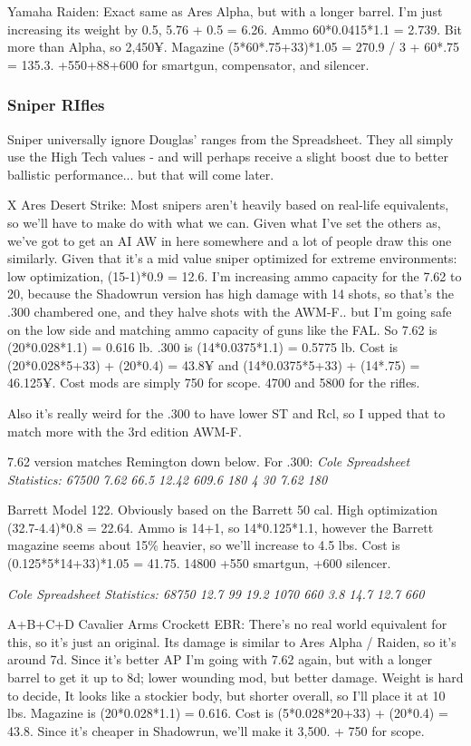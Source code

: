 \begin{multicols*}{2}
	Yamaha Raiden: Exact same as Ares Alpha, but with a longer barrel. I'm just increasing its weight by 0.5, 5.76 + 0.5 = 6.26. Ammo 60*0.0415*1.1 = 2.739. Bit more than Alpha, so 2,450¥. Magazine (5*60*.75+33)*1.05 = 270.9 / 3 + 60*.75 = 135.3. +550+88+600 for smartgun, compensator, and silencer.
	
	\subsubsection{Sniper RIfles}
	
	Sniper universally ignore Douglas' ranges from the Spreadsheet. They all simply use the High Tech values - and will perhaps receive a slight boost due to better ballistic performance... but that will come later.
	
	X Ares Desert Strike: Most snipers aren't heavily based on real-life equivalents, so we'll have to make do with what we can. Given what I've set the others as, we've got to get an AI AW in here somewhere and a lot of people draw this one similarly. Given that it's a mid value sniper optimized for extreme environments: low optimization, (15-1)*0.9 = 12.6. I'm increasing ammo capacity for the 7.62 to 20, because the Shadowrun version has high damage with 14 shots, so that's the .300 chambered one, and they halve shots with the AWM-F.. but I'm going safe on the low side and matching ammo capacity of guns like the FAL. So 7.62 is (20*0.028*1.1) = 0.616 lb. .300 is (14*0.0375*1.1) = 0.5775 lb. Cost is (20*0.028*5+33) + (20*0.4) = 43.8¥ and (14*0.0375*5+33) + (14*.75) = 46.125¥. Cost mods are simply 750 for scope. 4700 and 5800 for the rifles.
	
	Also it's really weird for the .300 to have lower ST and Rcl, so I upped that to match more with the 3rd edition AWM-F.
	
	7.62 version matches Remington down below.
	For .300:
	\textit{\textcolor{OliveGreen}{Cole Spreadsheet Statistics: 67500 7.62 66.5 12.42 609.6 180 4 30 7.62 180}}
	
	Barrett Model 122. Obviously based on the Barrett 50 cal. High optimization (32.7-4.4)*0.8 = 22.64. Ammo is  14+1, so  14*0.125*1.1, however the Barrett magazine seems about 15\% heavier, so we'll increase to 4.5 lbs. Cost is (0.125*5*14+33)*1.05 = 41.75. 14800 +550 smartgun, +600 silencer.
	
	\textit{\textcolor{OliveGreen}{Cole Spreadsheet Statistics: 68750 12.7 99 19.2 1070 660 3.8 14.7 12.7 660}}
	
	A+B+C+D
	Cavalier Arms Crockett EBR: There's no real world equivalent for this, so it's just an original. Its damage is similar to Ares Alpha / Raiden, so it's around 7d. Since it's better AP I'm going with 7.62 again, but with a longer barrel to get it up to 8d; lower wounding mod, but better damage. Weight is hard to decide,  It looks like a stockier body, but shorter overall, so I'll place it at 10 lbs. Magazine is (20*0.028*1.1) = 0.616. Cost is (5*0.028*20+33) + (20*0.4) = 43.8. Since it's cheaper in Shadowrun, we'll make it 3,500. + 750 for scope.
	

\end{multicols*}
